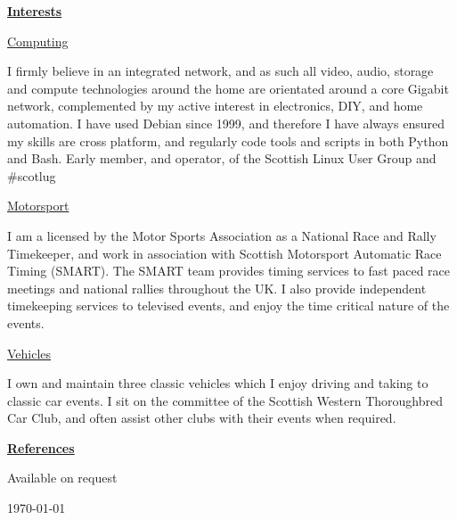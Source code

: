 \documentclass[10pt]{report}
\begin{document}

\begin{flushleft}
\bf{\underline{Interests}}
\end{flushleft}

\begin{flushleft}
\underline{Computing}
\end{flushleft}

\begin{flushleft}
I firmly believe in an integrated network, and as such all video, audio, storage and compute technologies around the home are orientated around a core Gigabit network, complemented by my active interest in electronics, DIY, and home automation.
I have used Debian since 1999, and therefore I have always ensured my skills are cross platform, and regularly code tools and scripts in both Python and Bash.
Early member, and operator, of the Scottish Linux User Group and \#scotlug
\end{flushleft}

\begin{flushleft}
\underline{Motorsport}
\end{flushleft}

\begin{flushleft}
I am a licensed by the Motor Sports Association as a National Race and Rally Timekeeper, and work in association with Scottish Motorsport Automatic Race Timing (SMART).
The SMART team provides timing services to fast paced race meetings and national rallies throughout the UK. I also provide independent timekeeping services to televised events, and enjoy the time critical nature of the events.
\end{flushleft}

\begin{flushleft}
\underline{Vehicles}
\end{flushleft}

\begin{flushleft}
I own and maintain three classic vehicles which I enjoy driving and taking to classic car events. I sit on the committee of the Scottish Western Thoroughbred Car Club, and often assist other clubs with their events when required.
\end{flushleft}

\begin{flushleft}
\bf{\underline{References}}
\end{flushleft}

\begin{flushleft}
Available on request
\end{flushleft}


\par\nopagebreak\hfill \today
\end{document}
